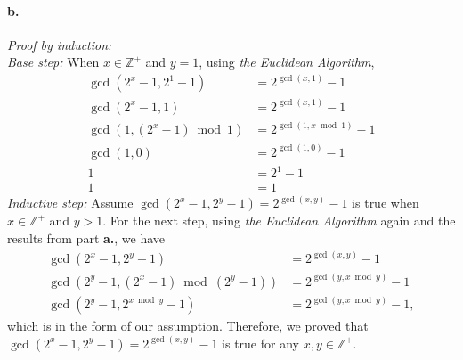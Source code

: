 \documentclass[11pt]{article}
\begin{document}
\paragraph{b.} \textit{Proof by induction:} \\
\textit{Base step:} When $x \in \mathbb{Z}^+$ and $y = 1$, using \textit{the Euclidean Algorithm},
\begin{align*}
    \gcd{(2^x - 1, 2^1 - 1)} &= 2^{\gcd{(x, 1)}} - 1 \\
    \gcd{(2^x - 1, 1)} &= 2^{\gcd{(x, 1)}} - 1 \\
    \gcd{(1, (2^x - 1) \bmod 1)} &= 2^{\gcd{(1, x \bmod 1)}} - 1 \\
    \gcd{(1, 0)} &= 2^{\gcd{(1, 0)}} - 1 \\
    1 &= 2^1 - 1 \\
    1 &= 1
\end{align*}
\textit{Inductive step:} Assume $\gcd{(2^x - 1, 2^y - 1)} = 2^{\gcd{(x, y)}} - 1$ is true when $x \in \mathbb{Z}^+$ and $y > 1$. For the next step, using \textit{the Euclidean Algorithm} again and the results from part \textbf{a.}, we have 
\begin{align*}
    \gcd{(2^x - 1, 2^y - 1)} &= 2^{\gcd{(x, y)}} - 1 \\
    \gcd{(2^y - 1, (2^x - 1) \bmod (2^y - 1))} &= 2^{\gcd{(y, x \bmod y)}} - 1 \\
    \gcd{(2^y - 1, 2^{x \bmod y} - 1)} &= 2^{\gcd{(y, x \bmod y)}} - 1,
\end{align*}
which is in the form of our assumption. Therefore, we proved that $\gcd{(2^x - 1, 2^y - 1)} = 2^{\gcd{(x, y)}} - 1$ is true for any $x, y \in \mathbb{Z}^+$.
\end{document}

